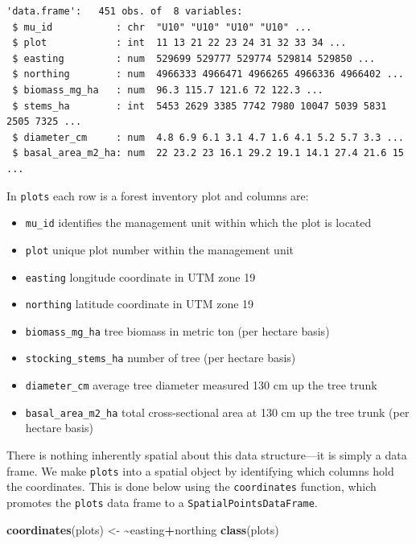 \documentclass[
]{krantz}
\makeatletter
\newenvironment{Shaded}{\begin{snugshade}}{\end{snugshade}}
\newcommand{\ErrorTok}[1]{\textcolor[rgb]{0.14,0.14,0.14}{\textbf{#1}}}
\newcommand{\KeywordTok}[1]{\textcolor[rgb]{0.27,0.27,0.27}{\textbf{#1}}}
\newcommand{\NormalTok}[1]{#1}
\newcommand{\OperatorTok}[1]{\textcolor[rgb]{0.43,0.43,0.43}{\textbf{#1}}}
\newcommand{\StringTok}[1]{\textcolor[rgb]{0.5,0.5,0.5}{#1}}
\providecommand{\tightlist}{%
  \setlength{\itemsep}{0pt}\setlength{\parskip}{0pt}}
\newenvironment{kframe}{%
\medskip{}
\setlength{\fboxsep}{.8em}
 \def\at@end@of@kframe{}%
 \ifinner\ifhmode%
  \def\at@end@of@kframe{\end{minipage}}%
  \begin{minipage}{\columnwidth}%
 \fi\fi%
 \def\FrameCommand##1{\hskip\@totalleftmargin \hskip-\fboxsep
 \colorbox{shadecolor}{##1}\hskip-\fboxsep
     \hskip-\linewidth \hskip-\@totalleftmargin \hskip\columnwidth}%
 \MakeFramed {\advance\hsize-\width
   \@totalleftmargin\z@ \linewidth\hsize
   \@setminipage}}%
 {\par\unskip\endMakeFramed%
 \at@end@of@kframe}
\renewenvironment{Shaded}{\begin{kframe}}{\end{kframe}}
\makeatother
\begin{document}
\begin{verbatim}
'data.frame':	451 obs. of  8 variables:
 $ mu_id           : chr  "U10" "U10" "U10" "U10" ...
 $ plot            : int  11 13 21 22 23 24 31 32 33 34 ...
 $ easting         : num  529699 529777 529774 529814 529850 ...
 $ northing        : num  4966333 4966471 4966265 4966336 4966402 ...
 $ biomass_mg_ha   : num  96.3 115.7 121.6 72 122.3 ...
 $ stems_ha        : int  5453 2629 3385 7742 7980 10047 5039 5831 2505 7325 ...
 $ diameter_cm     : num  4.8 6.9 6.1 3.1 4.7 1.6 4.1 5.2 5.7 3.3 ...
 $ basal_area_m2_ha: num  22 23.2 23 16.1 29.2 19.1 14.1 27.4 21.6 15 ...
\end{verbatim}

In \texttt{plots} each row is a forest inventory plot and columns are:

\begin{itemize}
\tightlist
\item
  \texttt{mu\_id} identifies the management unit within which the plot is located
\item
  \texttt{plot} unique plot number within the management unit
\item
  \texttt{easting} longitude coordinate in UTM zone 19
\item
  \texttt{northing} latitude coordinate in UTM zone 19
\item
  \texttt{biomass\_mg\_ha} tree biomass in metric ton (per hectare basis)
\item
  \texttt{stocking\_stems\_ha} number of tree (per hectare basis)
\item
  \texttt{diameter\_cm} average tree diameter measured 130 cm up the tree trunk
\item
  \texttt{basal\_area\_m2\_ha} total cross-sectional area at 130 cm up the tree trunk (per hectare basis)
\end{itemize}

There is nothing inherently spatial about this data structure---it is simply a data frame. We make \texttt{plots} into a spatial object by identifying which columns hold the coordinates. This is done below using the \texttt{coordinates} function, which promotes the \texttt{plots} data frame to a \texttt{SpatialPointsDataFrame}.

\begin{Shaded}
\begin{Highlighting}[]
\KeywordTok{coordinates}\NormalTok{(plots) \textless{}{-}}\StringTok{ }\ErrorTok{\textasciitilde{}}\NormalTok{easting}\OperatorTok{+}\NormalTok{northing}
\KeywordTok{class}\NormalTok{(plots)}
\end{Highlighting}
\end{Shaded}
\end{document}
